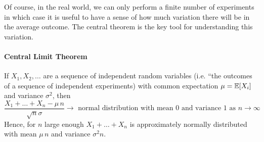 Of course, in the real world, we can only perform a finite number of experiments in which case it is useful to have a sense of how much variation there will be in the average outcome. The central theorem is the key tool for understanding this variation. 

\paragraph{Central Limit Theorem} If $X_1,X_2,\dots$ are a sequence of independent random variables (i.e. ``the outcomes of a sequence of independent experiments) with common expectation $\mu= \mathbb{E}[X_i]$ and variance $\sigma^2$, then 
\begin{equation}
\frac{X_1+\dots +X_n-\mu \,n }{\sqrt{n}\sigma} \to \mbox{ normal distribution with mean $0$ and variance $1$ as $n\to \infty$ }
\end{equation}
Hence, for $n$ large enough 
$
X_1+\dots+X_n 
$
is approximately normally distributed with mean $\mu\,n$ and variance $\sigma^2 n$. 
